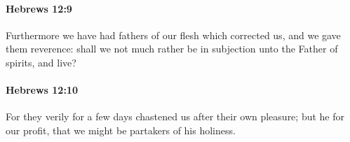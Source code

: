 		\paragraph{Hebrews 12:9} %
			\label{HEBREWS-12-9}

			Furthermore we have had fathers of our flesh which corrected us, and we gave them reverence: shall we not much rather be in subjection unto the Father of spirits, and live?

			\begin{framed}
			\scriptsize
				\begin{compactdesc}
					\item[SBLG] 
				\end{compactdesc}
			\end{framed}

		\paragraph{Hebrews 12:10} %
			\label{HEBREWS-12-10}

			For they verily for a few days chastened us after their own pleasure; but he for our profit, that we might be partakers of his holiness.

